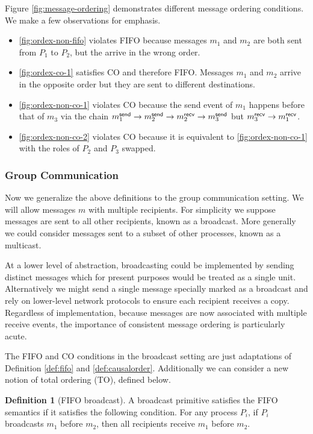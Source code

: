 \documentclass[]             %
{NASA}                       %
\theoremstyle{definition}
\newtheorem{definition}{Definition}[section]
\begin{document}
Figure \ref{fig:message-ordering} demonstrates different message
ordering conditions. We make a few observations for emphasis.

\begin{itemize}
\item \ref{fig:ordex-non-fifo} violates FIFO because messages $m_1$
  and $m_2$ are both sent from $P_1$ to $P_2$, but the arrive in the wrong order.
\item \ref{fig:ordex-co-1} satisfies CO and therefore FIFO. Messages
  $m_1$ and $m_2$ arrive in the opposite order but they are sent to
  different destinations.
\item \ref{fig:ordex-non-co-1} violates CO because the send event of
  $m_1$ happens before that of $m_3$ via the chain
  $m_{1}^{\mathsf{send}} \to m_{2}^{\mathsf{send}} \to m_{2}^{\mathsf{recv}} \to m_{3}^{\mathsf{send}}$ but
  $m_{3}^{\mathsf{recv}} \to m_{1}^{\mathsf{recv}}$.
\item \ref{fig:ordex-non-co-2} violates CO because it is equivalent to
  \ref{fig:ordex-non-co-1} with the roles of $P_2$ and $P_3$ swapped.
\end{itemize}

\subsubsection{Group Communication}
Now we generalize the above definitions to the group communication
setting. We will allow messages $m$ with multiple recipients. For
simplicity we suppose messages are sent to all other recipients, known
as a broadcast. More generally we could consider messages sent to a
subset of other processes, known as a multicast.

At a lower level of abstraction, broadcasting could be implemented by
sending distinct messages which for present purposes would be treated
as a single unit. Alternatively we might send a single message
specially marked as a broadcast and rely on lower-level network
protocols to ensure each recipient receives a copy. Regardless of
implementation, because messages are now associated with multiple
receive events, the importance of consistent message ordering is
particularly acute.

The FIFO and CO conditions in the broadcast setting are just
adaptations of Definition \ref{def:fifo} and
\ref{def:causalorder}. Additionally we can consider a new notion of
total ordering (TO), defined below.

\begin{definition}[FIFO broadcast]
  \label{def:fifo-bcast}
  A broadcast primitive satisfies the FIFO semantics if it satisfies
  the following condition. For any process $P_i$, if $P_i$ broadcasts
  $m_1$ before $m_2$, then all recipients receive $m_1$ before $m_2$.
\end{definition}
\end{document}
